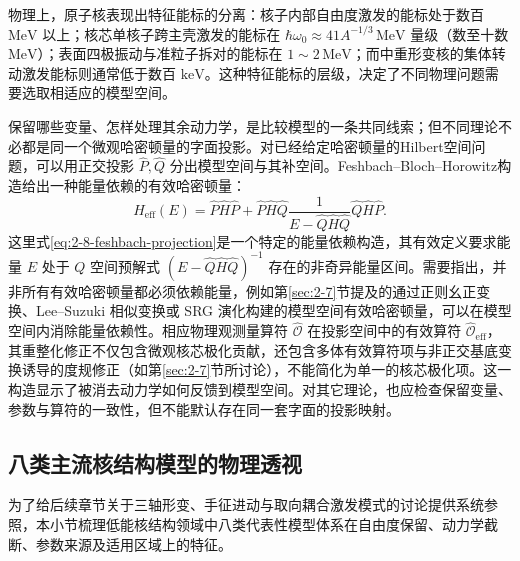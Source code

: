物理上，原子核表现出特征能标的分离：核子内部自由度激发的能标处于数百 $\mathrm{MeV}$ 以上；核芯单核子跨主壳激发的能标在 $\hbar\omega_0 \approx 41 A^{-1/3}\,\mathrm{MeV}$ 量级（数至十数 $\mathrm{MeV}$）；表面四极振动与准粒子拆对的能标在 $1\sim 2\,\mathrm{MeV}$；而中重形变核的集体转动激发能标则通常低于数百 $\mathrm{keV}$。这种特征能标的层级，决定了不同物理问题需要选取相适应的模型空间。

保留哪些变量、怎样处理其余动力学，是比较模型的一条共同线索；但不同理论不必都是同一个微观哈密顿量的字面投影。对已经给定哈密顿量的Hilbert空间问题，可以用正交投影 $\hat P,\hat Q$ 分出模型空间与其补空间。Feshbach--Bloch--Horowitz构造给出一种能量依赖的有效哈密顿量：
\begin{equation}\label{eq:2-8-feshbach-projection}
\hat{H}_{\mathrm{eff}}(E) = \hat{P}\hat{H}\hat{P} + \hat{P}\hat{H}\hat{Q}\frac{1}{E - \hat{Q}\hat{H}\hat{Q}}\hat{Q}\hat{H}\hat{P} .
\end{equation}
这里式\eqref{eq:2-8-feshbach-projection}是一个特定的能量依赖构造，其有效定义要求能量 $E$ 处于 $Q$ 空间预解式 $(E - \hat{Q}\hat{H}\hat{Q})^{-1}$ 存在的非奇异能量区间。需要指出，并非所有有效哈密顿量都必须依赖能量，例如第\ref{sec:2-7}节提及的通过正则幺正变换、Lee--Suzuki 相似变换或 SRG 演化构建的模型空间有效哈密顿量，可以在模型空间内消除能量依赖性。相应物理观测量算符 $\hat{\mathcal{O}}$ 在投影空间中的有效算符 $\hat{\mathcal{O}}_{\mathrm{eff}}$，其重整化修正不仅包含微观核芯极化贡献，还包含多体有效算符项与非正交基底变换诱导的度规修正（如第\ref{sec:2-7}节所讨论），不能简化为单一的核芯极化项。这一构造显示了被消去动力学如何反馈到模型空间。对其它理论，也应检查保留变量、参数与算符的一致性，但不能默认存在同一套字面的投影映射。

\subsection{八类主流核结构模型的物理透视}\label{sec:2-8-2}

为了给后续章节关于三轴形变、手征进动与取向耦合激发模式的讨论提供系统参照，本小节梳理低能核结构领域中八类代表性模型体系在自由度保留、动力学截断、参数来源及适用区域上的特征。\cite{book-bohr-mottelson-nuclear-structure-vol2,book-suhonen-from-nucleons-to-nucleus,prochniak-rohozinski-2009-bohr-collective-hamiltonian,frauendorf-2001-spontaneous-symmetry-breaking-rotating-nuclei,doctoral-r1-g28-otsuka-2023-type-ii-shell-evolution}

